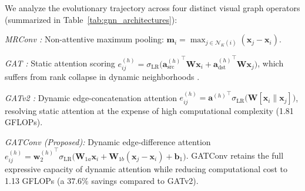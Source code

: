 \documentclass[]{interact}
\theoremstyle{plain}
\theoremstyle{definition}
\theoremstyle{remark}
\begin{document}
{We analyze the evolutionary trajectory across four distinct visual graph operators (summarized in Table~\ref{tab:gnn_architectures}):

\textit{MRConv \citep{han2022vision}:} Non-attentive maximum pooling: $\mathbf{m}_i = \max_{j \in \mathcal{N}_K(i)} (\mathbf{x}_j - \mathbf{x}_i)$.

\textit{GAT \citep{velickovic2018graph}:} Static attention scoring $e_{ij}^{(h)} = \sigma_{\text{LR}}\!\Big({\mathbf{a}_{\text{src}}^{(h)}}^\top \mathbf{W}\mathbf{x}_i + {\mathbf{a}_{\text{dst}}^{(h)}}^\top \mathbf{W}\mathbf{x}_j\Big)$, which suffers from rank collapse in dynamic neighborhoods \citep{brody2022gat}.

\textit{GATv2 \citep{brody2022gat}:} Dynamic edge-concatenation attention $e_{ij}^{(h)} = {\mathbf{a}^{(h)}}^\top \sigma_{\text{LR}}\!\Big(\mathbf{W}[\mathbf{x}_i \parallel \mathbf{x}_j]\Big)$, resolving static attention at the expense of high computational complexity (1.81 GFLOPs).

\textit{GATConv (Proposed):} Dynamic edge-difference attention $e_{ij}^{(h)} = {\mathbf{w}_2^{(h)}}^\top \sigma_{\text{LR}}\!\Big(\mathbf{W}_{1a}\mathbf{x}_i + \mathbf{W}_{1b}(\mathbf{x}_j - \mathbf{x}_i) + \mathbf{b}_1\Big)$. GATConv retains the full expressive capacity of dynamic attention while reducing computational cost to 1.13 GFLOPs (a $37.6\%$ savings compared to GATv2).

}
\end{document}
